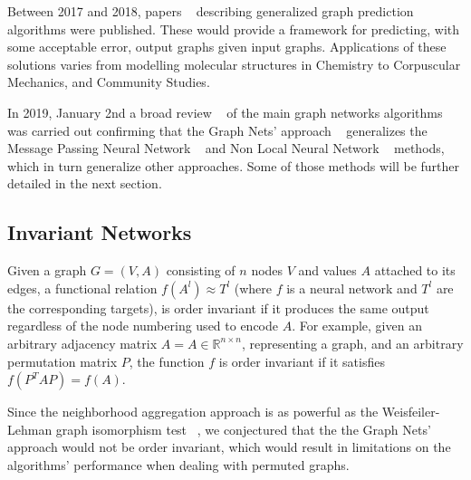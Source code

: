 Between 2017 and 2018, papers ~\cite{Battaglia_2018, Gilmer_2017, Wang_2018} describing generalized graph prediction algorithms were published. These would provide a framework for predicting, with some acceptable error, output graphs given input graphs. Applications of these solutions varies from modelling molecular structures in Chemistry to Corpuscular Mechanics, and Community Studies.

In 2019, January 2nd a broad review ~\cite{Zhou_2019} of the main graph networks algorithms was carried out confirming that the Graph Nets’ approach ~\cite{Battaglia_2018} generalizes the Message Passing Neural Network ~\cite{Gilmer_2017} and Non Local Neural Network ~\cite{Wang_2018} methods, which in turn generalize other approaches. Some of those methods will be further detailed in the next section.


\subsection{Invariant Networks}

Given a graph $G = (V, A)$ consisting of $n$ nodes $V$ and values $A$ attached to its edges, a functional relation $f(A^l) \approx T^l$ (where $f$ is a neural network and $T^l$ are the corresponding targets), is order invariant if it produces the same output regardless of the node numbering used to encode $A$. For example, given an arbitrary adjacency matrix $A = A \in \mathds{R}^{n \times n}$, representing a graph, and an arbitrary permutation matrix $P$, the function $f$ is order invariant if it satisfies $f(P^T A P) = f(A)$.

Since the neighborhood aggregation approach is as powerful as the Weisfeiler-Lehman graph isomorphism test ~\cite{Xu_2018}, we conjectured that the the Graph Nets’ approach would not be order invariant, which would result in limitations on the algorithms’ performance when dealing with permuted graphs. 